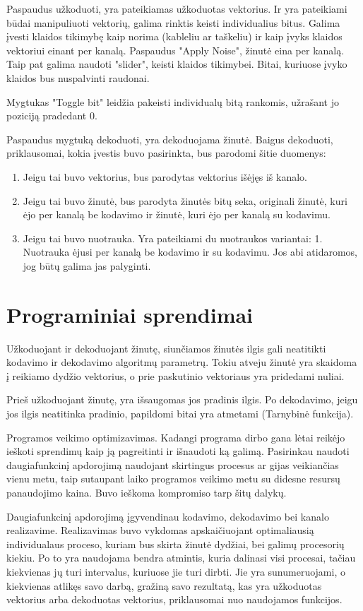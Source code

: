 \documentclass{article}
\begin{document}
Paspaudus užkoduoti, yra pateikiamas užkoduotas vektorius. Ir yra pateikiami būdai manipuliuoti vektorių, galima rinktis keisti individualius bitus. Galima įvesti klaidos tikimybę kaip norima (kableliu ar taškeliu) ir kaip įvyks klaidos vektoriui einant per kanalą. Paspaudus "Apply Noise", žinutė eina per kanalą. Taip pat galima naudoti "slider", keisti klaidos tikimybei.
Bitai, kuriuose įvyko klaidos bus nuspalvinti raudonai.

Mygtukas "Toggle bit" leidžia pakeisti individualų bitą rankomis, užrašant jo poziciją pradedant 0.

Paspaudus mygtuką dekoduoti, yra dekoduojama žinutė. Baigus dekoduoti, priklausomai, kokia įvestis buvo pasirinkta, bus parodomi šitie duomenys:
\begin{enumerate}
    \item Jeigu tai buvo vektorius, bus parodytas vektorius išėjęs iš kanalo.
    \item Jeigu tai buvo žinutė, bus parodyta žinutės bitų seka, originali žinutė, kuri ėjo per kanalą be kodavimo ir žinutė, kuri ėjo per kanalą su kodavimu.
    \item Jeigu tai buvo nuotrauka. Yra pateikiami du nuotraukos variantai: 1. Nuotrauka ėjusi per kanalą be kodavimo ir su kodavimu. Jos abi atidaromos, jog būtų galima jas palyginti.
\end{enumerate}


\section{Programiniai sprendimai}
Užkoduojant ir dekoduojant žinutę, siunčiamos žinutės ilgis gali neatitikti kodavimo ir dekodavimo algoritmų parametrų. Tokiu atveju žinutė yra skaidoma į reikiamo dydžio vektorius, o prie paskutinio vektoriaus yra pridedami nuliai.

Prieš užkoduojant žinutę, yra išsaugomas jos pradinis ilgis. Po dekodavimo, jeigu jos ilgis neatitinka pradinio, papildomi bitai yra atmetami (Tarnybinė funkcija).

Programos veikimo optimizavimas. Kadangi programa dirbo gana lėtai reikėjo ieškoti sprendimų kaip ją pagreitinti ir išnaudoti ką galimą. Pasirinkau naudoti daugiafunkcinį apdorojimą naudojant skirtingus procesus ar gijas veikiančias vienu metu, taip sutaupant laiko programos veikimo metu su didesne resursų panaudojimo kaina. Buvo ieškoma kompromiso tarp šitų dalykų. 

Daugiafunkcinį apdorojimą įgyvendinau kodavimo, dekodavimo bei kanalo realizavime. Realizavimas buvo vykdomas apskaičiuojant optimaliausią individualaus proceso, kuriam bus skirta žinutė dydžiai, bei galimų procesorių kiekiu. Po to yra naudojama bendra atmintis, kuria dalinasi visi procesai, tačiau kiekvienas jų turi intervalus, kuriuose jie turi dirbti. Jie yra sunumeruojami, o kiekvienas atlikęs savo darbą, gražiną savo rezultatą, kas yra užkoduotas vektorius arba dekoduotas vektorius, priklausomai nuo naudojamos funkcijos.
\end{document}
